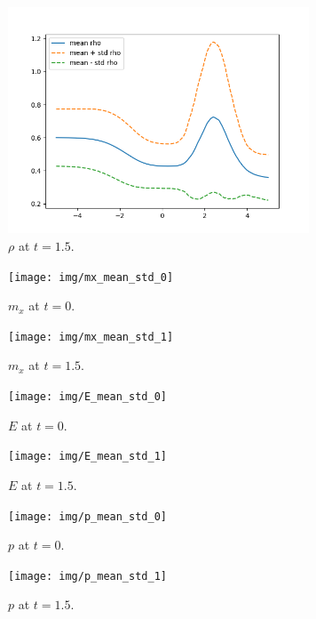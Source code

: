 \begin{figure}
	\includegraphics[width=0.8\textwidth]{img/rho_mean_std_1}
	
	\caption{$\rho$ at $t=1.5$.}
\end{figure}

\begin{figure}
	\texttt{[image: img/mx\_mean\_std\_0]}
	
	\caption{$m_x$ at $t=0$.}
\end{figure}

\begin{figure}
	\texttt{[image: img/mx\_mean\_std\_1]}
	
	\caption{$m_x$ at $t=1.5$.}
\end{figure}


\begin{figure}
	\texttt{[image: img/E\_mean\_std\_0]}
	
	\caption{$E$ at $t=0$.}
\end{figure}

\begin{figure}
	\texttt{[image: img/E\_mean\_std\_1]}
	
	\caption{$E$ at $t=1.5$.}
\end{figure}


\begin{figure}
	\texttt{[image: img/p\_mean\_std\_0]}
	
	\caption{$p$ at $t=0$.}
\end{figure}

\begin{figure}
	\texttt{[image: img/p\_mean\_std\_1]}
	
	\caption{$p$ at $t=1.5$.}
\end{figure}




